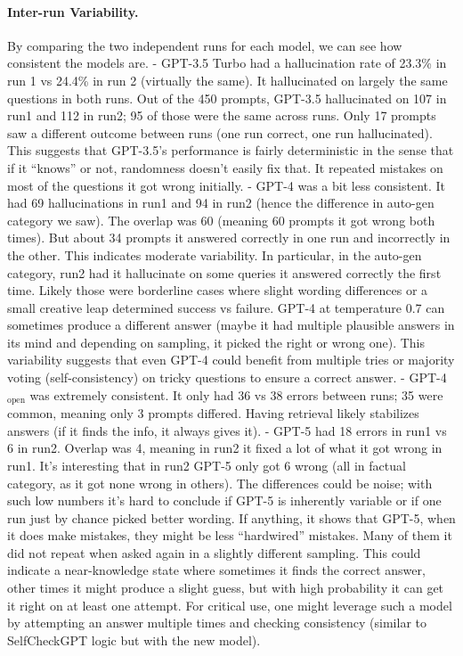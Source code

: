 \documentclass{article}
\begin{document}
\paragraph{Inter-run Variability.}
By comparing the two independent runs for each model, we can see how consistent the models are. 
- GPT-3.5 Turbo had a hallucination rate of 23.3\% in run 1 vs 24.4\% in run 2 (virtually the same). It hallucinated on largely the same questions in both runs. Out of the 450 prompts, GPT-3.5 hallucinated on 107 in run1 and 112 in run2; 95 of those were the same across runs. Only 17 prompts saw a different outcome between runs (one run correct, one run hallucinated). This suggests that GPT-3.5’s performance is fairly deterministic in the sense that if it “knows” or not, randomness doesn’t easily fix that. It repeated mistakes on most of the questions it got wrong initially.
- GPT-4 was a bit less consistent. It had 69 hallucinations in run1 and 94 in run2 (hence the difference in auto-gen category we saw). The overlap was 60 (meaning 60 prompts it got wrong both times). But about 34 prompts it answered correctly in one run and incorrectly in the other. This indicates moderate variability. In particular, in the auto-gen category, run2 had it hallucinate on some queries it answered correctly the first time. Likely those were borderline cases where slight wording differences or a small creative leap determined success vs failure. GPT-4 at temperature 0.7 can sometimes produce a different answer (maybe it had multiple plausible answers in its mind and depending on sampling, it picked the right or wrong one). This variability suggests that even GPT-4 could benefit from multiple tries or majority voting (self-consistency) on tricky questions to ensure a correct answer.
- GPT-4$_\text{open}$ was extremely consistent. It only had 36 vs 38 errors between runs; 35 were common, meaning only 3 prompts differed. Having retrieval likely stabilizes answers (if it finds the info, it always gives it).
- GPT-5 had 18 errors in run1 vs 6 in run2. Overlap was 4, meaning in run2 it fixed a lot of what it got wrong in run1. It's interesting that in run2 GPT-5 only got 6 wrong (all in factual category, as it got none wrong in others). The differences could be noise; with such low numbers it's hard to conclude if GPT-5 is inherently variable or if one run just by chance picked better wording. If anything, it shows that GPT-5, when it does make mistakes, they might be less “hardwired” mistakes. Many of them it did not repeat when asked again in a slightly different sampling. This could indicate a near-knowledge state where sometimes it finds the correct answer, other times it might produce a slight guess, but with high probability it can get it right on at least one attempt. For critical use, one might leverage such a model by attempting an answer multiple times and checking consistency (similar to SelfCheckGPT logic but with the new model).
\end{document}
